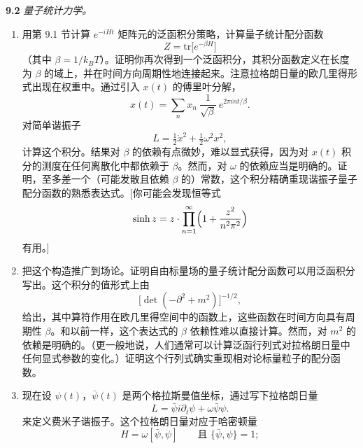 \textbf{9.2} \emph{量子统计力学。}
\begin{enumerate}[label=(\alph*)]
  \item 用第 9.1 节计算 $e^{-iHt}$ 矩阵元的泛函积分策略，计算量子统计配分函数
    \begin{equation}
      Z = \mathrm{tr}\bigl[ e^{-\beta H} \bigr]
    \end{equation}
    （其中 $\beta = 1/k_BT$）。证明你再次得到一个泛函积分，其积分函数定义在长度为 $\beta$ 的域上，并在时间方向周期性地连接起来。注意拉格朗日量的欧几里得形式出现在权重中。通过引入 $x(t)$ 的傅里叶分解，
    \begin{equation}
      x(t) = \sum_n x_n\ \frac{1}{\sqrt{\beta}}\ e^{2\pi int/\beta} .
    \end{equation}
    对简单谐振子
    \begin{equation}
      L = \tfrac{1}{2}\dot{x}^2 + \tfrac{1}{2}\omega^2x^2 ,
    \end{equation}
    计算这个积分。结果对 $\beta$ 的依赖有点微妙，难以显式获得，因为对 $x(t)$ 积分的测度在任何离散化中都依赖于 $\beta$。然而，对 $\omega$ 的依赖应当是明确的。证明，至多差一个（可能发散且依赖 $\beta$ 的）常数，这个积分精确重现谐振子量子配分函数的熟悉表达式。[你可能会发现恒等式
    \begin{equation}
      \sinh z = z\cdot\prod_{n=1}^{\infty}\Bigl( 1 + \frac{z^2}{n^2\pi^2}
        \Bigr)
    \end{equation}
    有用。]
  \item 把这个构造推广到场论。证明自由标量场的量子统计配分函数可以用泛函积分写出。这个积分的值形式上由
    \begin{equation}
      \bigl[ \det(-\partial^2+m^2) \bigr]^{-1/2} ,
    \end{equation}
    给出，其中算符作用在欧几里得空间中的函数上，这些函数在时间方向具有周期性 $\beta$。和以前一样，这个表达式的 $\beta$ 依赖性难以直接计算。然而，对 $m^2$ 的依赖是明确的。（更一般地说，人们通常可以计算泛函行列式对拉格朗日量中任何显式参数的变化。）证明这个行列式确实重现相对论标量粒子的配分函数。
  \item 现在设 $\psi(t)$，$\bar{\psi}(t)$ 是两个格拉斯曼值坐标，通过写下拉格朗日量
    \begin{equation}
      L = \bar{\psi}i\partial_t\psi + \omega\bar{\psi}\psi .
    \end{equation}
    来定义费米子谐振子。这个拉格朗日量对应于哈密顿量
    \begin{equation}
      H = \omega[\bar{\psi}, \psi] \qquad\text{且 } \{\bar{\psi},\psi\}=1;
    \end{equation}

\end{enumerate}
